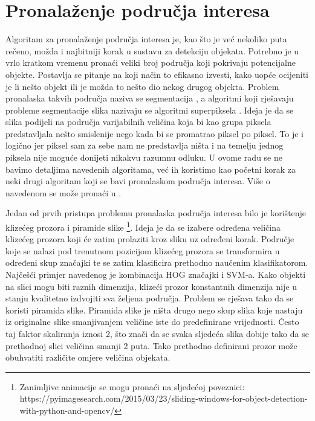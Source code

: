 \documentclass[times, utf8, diplomski]{fer}
\begin{document}
\section{Pronalaženje područja interesa}
Algoritam za pronalaženje područja interesa je, kao što je već nekoliko puta rečeno, možda i najbitniji korak u sustavu za detekciju objekata. Potrebno je u vrlo kratkom vremenu pronaći veliki broj područja koji pokrivaju potencijalne objekte. Postavlja se pitanje na koji način to efikasno izvesti, kako uopće ocijeniti je li nešto objekt ili je možda to nešto dio nekog drugog objekta. Problem pronalaska takvih područja naziva se segmentacija , a algoritmi koji rješavaju probleme segmentacije slika nazivaju se algoritmi superpiksela . Ideja je da se slika podijeli na područja varijabilnih veličina koja bi kao grupa piksela predstavljala nešto smislenije nego kada bi se promatrao piksel po piksel. To je i logično jer piksel sam za sebe nam ne predstavlja ništa i na temelju jednog piksela nije moguće donijeti nikakvu razumnu odluku. U ovome radu se ne bavimo detaljima navedenih algoritama, već ih koristimo kao početni korak za neki drugi algoritam koji se bavi pronalaskom područja interesa. Više o navedenom se može pronaći u \citep{slic-paper}.

Jedan od prvih pristupa problemu pronalaska područja interesa bilo je korištenje klizećeg prozora  i piramide slike \footnote{Zanimljive animacije se mogu pronaći na sljedećoj poveznici: https://pyimagesearch.com/2015/03/23/sliding-windows-for-object-detection-with-python-and-opencv/}. Ideja je da se izabere određena veličina klizećeg prozora koji će zatim prolaziti kroz sliku uz određeni korak. Područje koje se nalazi pod trenutnom pozicijom klizećeg prozora se transformira u određeni skup značajki te se zatim klasificira prethodno naučenim klasifikatorom. Najčešći primjer navedenog je kombinacija HOG značajki i SVM-a. Kako objekti na slici mogu biti raznih dimenzija, klizeći prozor konstantnih dimenzija nije u stanju kvalitetno izdvojiti sva željena područja. Problem se rješava tako da se koristi piramida slike. Piramida slike je ništa drugo nego skup slika koje nastaju iz originalne slike smanjivanjem veličine  iste do predefinirane vrijednosti. Često taj faktor skaliranja iznosi 2, što znači da se svaka sljedeća slika dobije tako da se prethodnoj slici veličina smanji 2 puta. Tako prethodno definirani prozor može obuhvatiti različite omjere veličina objekata.
\end{document}

